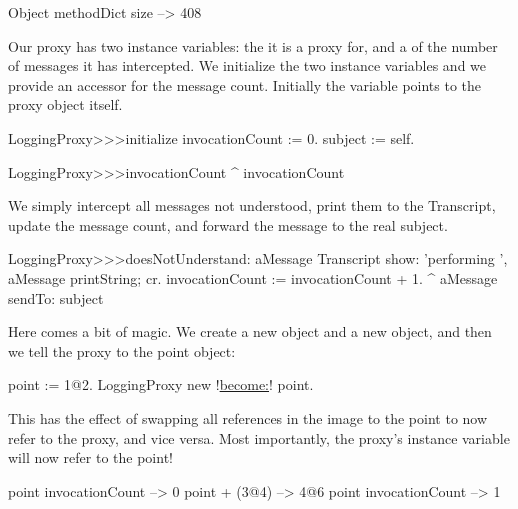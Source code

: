 \documentclass[a4paper,10pt,twoside]{book}
\begin{document}
{\begin{code}{}
Object methodDict size --> 408
\end{code}

Our proxy has two instance variables: the  it is a proxy for, and a  of the number of messages it has intercepted.
We initialize the two instance variables and we provide an accessor for the message count.
Initially the  variable points to the proxy object itself.
\begin{code}{}
LoggingProxy>>>initialize
	invocationCount := 0.
	subject := self.
\end{code}

\begin{code}{}
LoggingProxy>>>invocationCount
	^ invocationCount
\end{code}

We simply intercept all messages not understood, print them to the Transcript, update the message count, and forward the message to the real subject.
\begin{code}{}
LoggingProxy>>>doesNotUnderstand: aMessage 
	Transcript show: 'performing ', aMessage printString; cr.
	invocationCount := invocationCount + 1.
	^ aMessage sendTo: subject
\end{code}

Here comes a bit of magic.
We create a new  object and a new  object, and then we tell the proxy to  the point object:
\begin{code}{}
point := 1@2.
LoggingProxy new !\underline{become:}! point.
\end{code}

This has the effect of swapping all references in the image to the point to now refer to the proxy, and vice versa. Most importantly, the proxy's  instance variable will now refer to the point!

\begin{code}{}
point invocationCount --> 0
point + (3@4)             --> 4@6
point invocationCount --> 1
\end{code}

}
\end{document}
